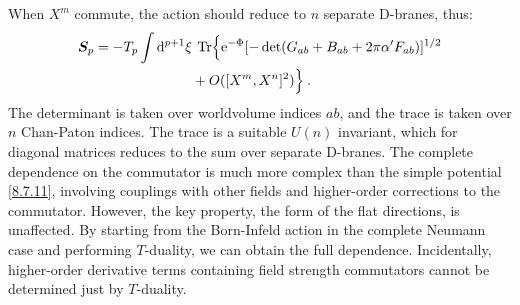 When $X^{m}$ commute, the action should reduce to $n$ separate D-branes, thus:
\begin{align}
	\bm{S}_{p} &= -T_{p} \int \mathrm{d}^{p+1} \xi \: \operatorname{Tr} \Bigl\{ \mathrm{e}^{-\Phi}
	[-\operatorname{det}(G_{ab} + B_{ab} + 2 \pi \alpha^{\prime} F_{ab})]^{1/2} \nonumber \\
	&\qquad \qquad \qquad \quad + O([X^{m}, X^{n}]^{2})\Bigr\} \:. \label{8.7.12}
\end{align}
The determinant is taken over worldvolume indices $ab$, and the trace is taken over $n$ Chan-Paton indices. The trace is a suitable $U(n)$ invariant, which for diagonal matrices reduces to the sum over separate D-branes. 
The complete dependence on the commutator is much more complex than the simple potential \eqref{8.7.11}, involving couplings with other fields and higher-order corrections to the commutator. 
However, the key property, the form of the flat directions, is unaffected. 
By starting from the Born-Infeld action in the complete Neumann case and performing $T$-duality, we can obtain the full dependence. 
Incidentally, higher-order derivative terms containing field strength commutators cannot be determined just by $T$-duality.

